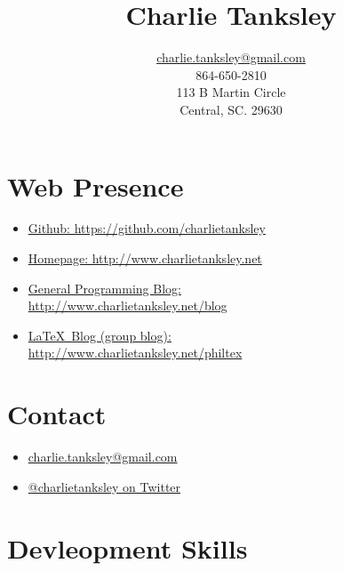 \documentclass{article}
\title{Charlie Tanksley}
\author{\href{mailto:charlie.tanksley@gmail.com}{charlie.tanksley@gmail.com}\\
        864-650-2810\\
        113 B Martin Circle\\
        Central, SC. 29630}
\date{\nodate}
\begin{document}
\setlength{\droptitle}{-1in}
\maketitle
\thispagestyle{fancy}

\hline
\begin{multicols}{2}

\section{Web Presence} %
\label{sec:Web Presence}

\begin{itemize}
  \item \href{https://github.com/charlietanksley}{Github:
    https://github.com/charlietanksley}
  \item \href{http://www.charlietanksley.net}{Homepage:
    http://www.charlietanksley.net}
  \item \href{http://www.charlietanksley.net/blog}{General Programming Blog:\\
    http://www.charlietanksley.net/blog}
  \item \href{http://www.charlietanksley.net/philtex}{\LaTeX\ Blog (group blog):\\
    http://www.charlietanksley.net/philtex}
\end{itemize}

\columnbreak
\section{Contact} %
\label{sec:Contact}

\begin{itemize}
  \item 
    \href{mailto:charlie.tanksley@gmail.com}{charlie.tanksley@gmail.com}
  \item \href{http://www.twitter.com/charlietanksley}{@charlietanksley 
    on Twitter}
\end{itemize}


\end{multicols}
\hline
\section{Devleopment Skills} %
\label{sec:Devleopment Skills}
\end{document}

